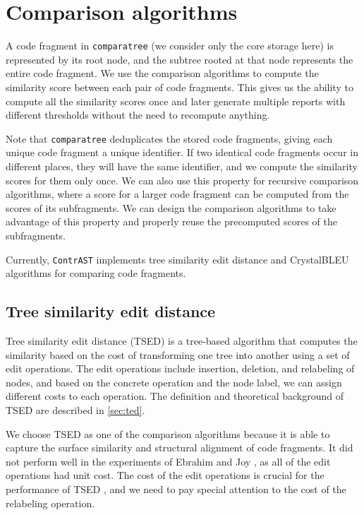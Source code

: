 \section{Comparison algorithms}

A code fragment in \texttt{comparatree} (we consider only the core storage here) is represented by its root node, and the subtree rooted at that node represents the entire code fragment.
We use the comparison algorithms to compute the similarity score between each pair of code fragments.
This gives us the ability to compute all the similarity scores once and later generate multiple reports with different thresholds without the need to recompute anything.

Note that \texttt{comparatree} deduplicates the stored code fragments, giving each unique code fragment a unique identifier.
If two identical code fragments occur in different places, they will have the same identifier, and we compute the similarity scores for them only once.
We can also use this property for recursive comparison algorithms, where a score for a larger code fragment can be computed from the scores of its subfragments.
We can design the comparison algorithms to take advantage of this property and properly reuse the precomputed scores of the subfragments.

Currently, \texttt{ContrAST} implements tree similarity edit distance and CrystalBLEU algorithms for comparing code fragments.

\subsection{Tree similarity edit distance}\label{sec:tsed}

Tree similarity edit distance (TSED) is a tree-based algorithm that computes the similarity based on the cost of transforming one tree into another using a set of edit operations.
The edit operations include insertion, deletion, and relabeling of nodes, and based on the concrete operation and the node label, we can assign different costs to each operation.
The definition and theoretical background of TSED are described in \autoref{sec:ted}.

We choose TSED as one of the comparison algorithms because it is able to capture the surface similarity \cite{dristi25} and structural alignment \cite{rahman26} of code fragments.
It did not perform well in the experiments of Ebrahim and Joy \cite{ebrahim26}, as all of the edit operations had unit cost.
The cost of the edit operations is crucial for the performance of TSED \cite{song24,changedistilling07}, and we need to pay special attention to the cost of the relabeling operation.

